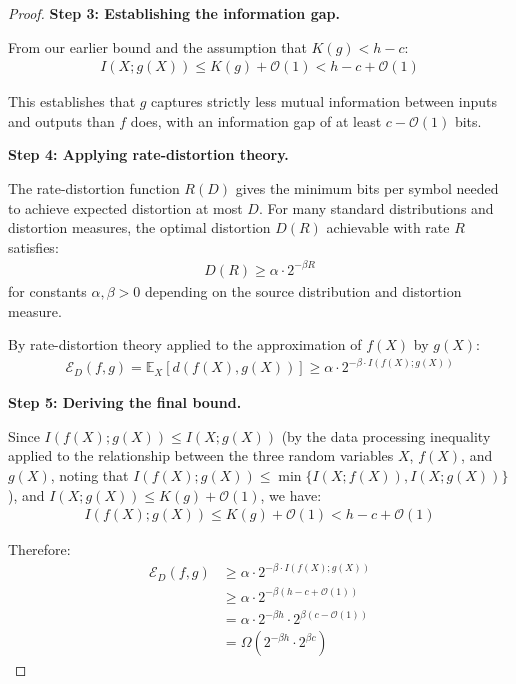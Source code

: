 \documentclass[11pt,letter,leqno]{article}
\begin{document}
\begin{proof}
\textbf{Step 3: Establishing the information gap.}

From our earlier bound and the assumption that $K(g) < h - c$:
\begin{align}
I(X; g(X)) \leq K(g) + \mathcal{O}(1) < h - c + \mathcal{O}(1)
\end{align}

This establishes that $g$ captures strictly less mutual information between 
inputs and outputs than $f$ does, with an information gap of at least 
$c - \mathcal{O}(1)$ bits.

\textbf{Step 4: Applying rate-distortion theory.}

The rate-distortion function $R(D)$ gives the minimum bits per symbol needed 
to achieve expected distortion at most $D$. For many standard distributions 
and distortion measures, the optimal distortion $D(R)$ achievable with rate 
$R$ satisfies:
\begin{align}
D(R) \geq \alpha \cdot 2^{-\beta R}
\end{align}
for constants $\alpha, \beta > 0$ depending on the source distribution and 
distortion measure.

By rate-distortion theory applied to the approximation of $f(X)$ by $g(X)$:
\begin{align}
\mathcal{E}_D(f, g) = \mathbb{E}_X[d(f(X), g(X))] \geq \alpha \cdot 2^{-\beta \cdot I(f(X); g(X))}
\end{align}

\textbf{Step 5: Deriving the final bound.}

Since $I(f(X); g(X)) \leq I(X; g(X))$ (by the data processing inequality 
applied to the relationship between the three random variables $X$, $f(X)$, 
and $g(X)$, noting that $I(f(X); g(X)) \leq \min\{I(X; f(X)), I(X; g(X))\}$), 
and $I(X; g(X)) \leq K(g) + \mathcal{O}(1)$, we have:
\begin{align}
I(f(X); g(X)) \leq K(g) + \mathcal{O}(1) < h - c + \mathcal{O}(1)
\end{align}

Therefore:
\begin{align}
\mathcal{E}_D(f, g) &\geq \alpha \cdot 2^{-\beta \cdot I(f(X); g(X))} \\
&\geq \alpha \cdot 2^{-\beta(h - c + \mathcal{O}(1))} \\
&= \alpha \cdot 2^{-\beta h} \cdot 2^{\beta(c - \mathcal{O}(1))} \\
&= \Omega(2^{-\beta h} \cdot 2^{\beta c})
\end{align}


\end{proof}
\end{document}
